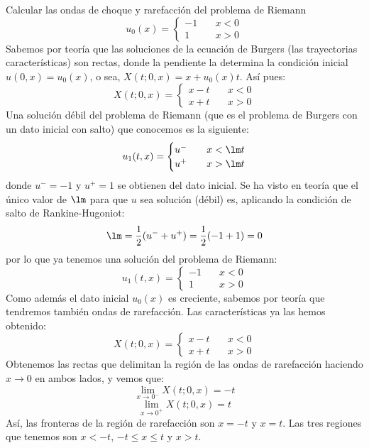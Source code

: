 \documentclass[12pt]{article}
\begin{document}
    \begin{ejercicio}
        Calcular las ondas de choque y rarefacción del problema de Riemann
        $$u_0(x) = \begin{cases}
            -1 \quad& x<0 \\
             1 \quad& x>0
        \end{cases}$$
        Sabemos por teoría que las soluciones de la ecuación de Burgers (las trayectorias características) son rectas,
        donde la pendiente la determina la condición inicial $u(0,x) = u_0(x)$, o sea, $X(t;0,x) = x + u_0(x)t$. Así pues:
        $$X(t;0,x) = \begin{cases}
            x - t \quad& x < 0 \\
            x + t \quad& x > 0
        \end{cases}$$
        Una solución débil del problema de Riemann (que es el problema de Burgers con un dato inicial con salto) que conocemos es la siguiente:
        $$u_1(t,x) = \begin{cases}
            u^{-} \quad& x < \lm t \\
            u^{+} \quad& x > \lm t
        \end{cases}$$
        donde $u^{-} = -1$ y $u^{+} = 1$ se obtienen del dato inicial. Se ha visto en teoría que el único valor de $\lm$ para 
        que $u$ sea solución (débil) es, aplicando la condición de salto de Rankine-Hugoniot:
        $$\lm = \dfrac{1}{2}(u^{-} + u^{+}) = \dfrac{1}{2}(-1+1) = 0$$
        por lo que ya tenemos una solución del problema de Riemann: 
        $$\boxed{u_1(t,x) = \begin{cases}
            -1 \quad& x < 0 \\
            1 \quad& x > 0
        \end{cases}}$$
        Como además el dato inicial $u_0(x)$ es creciente, sabemos por teoría que tendremos también ondas de rarefacción. Las características ya
        las hemos obtenido:
        $$X(t;0,x) = \begin{cases}
            x - t \quad& x < 0 \\
            x + t \quad& x > 0
        \end{cases}$$
        Obtenemos las rectas que delimitan la región de las ondas de rarefacción haciendo $x \to 0$ en ambos lados, y vemos que:
        $$\lim\limits_{x \to 0^{-}}X(t;0,x) = -t$$
        $$\lim\limits_{x \to 0^{+}}X(t;0,x) = t$$
        Así, las fronteras de la región de rarefacción son $x = -t$ y $x=t$. Las tres regiones que tenemos son $x < -t$, $-t \leq x \leq t$ y $x > t$.

\end{ejercicio}
\end{document}
